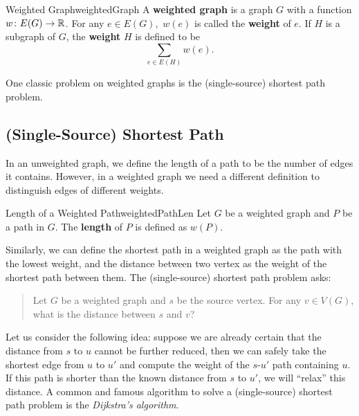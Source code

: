 \documentclass[math]{amznotes}
\theoremstyle{remark}
\begin{document}
\begin{dfnbox}{Weighted Graph}{weightedGraph}
    A {\color{red} \textbf{weighted graph}} is a graph $G$ with a function $w \colon E(G) \to \mathbb{R}$. For any $e \in E(G)$,~$w(e)$ is called the {\color{red} \textbf{weight}} of $e$. If $H$ is a subgraph of $G$, the {\color{red} \textbf{weight}} $H$ is defined to be
    \begin{equation*}
        \sum_{e \in E(H)}w(e).
    \end{equation*}
\end{dfnbox} 
One classic problem on weighted graphs is the (single-source) shortest path problem.
\subsection{(Single-Source) Shortest Path}
In an unweighted graph, we define the length of a path to be the number of edges it contains. However, in a weighted graph we need a different definition to distinguish edges of different weights.
\begin{dfnbox}{Length of a Weighted Path}{weightedPathLen}
    Let $G$ be a weighted graph and $P$ be a path in $G$. The {\color{red} \textbf{length}} of $P$ is defined as $w(P)$.
\end{dfnbox}
Similarly, we can define the shortest path in a weighted graph as the path with the lowest weight, and the distance between two vertex as the weight of the shortest path between them. The (single-source) shortest path problem asks:
\begin{quote}
    Let $G$ be a weighted graph and $s$ be the source vertex. For any $v \in V(G)$, what is the distance between $s$ and $v$?
\end{quote}
Let us consider the following idea: suppose we are already certain that the distance from $s$ to $u$ cannot be further reduced, then we can safely take the shortest edge from $u$ to $u'$ and compute the weight of the $s$-$u'$ path containing $u$. If this path is shorter than the known distance from $s$ to $u'$, we will ``relax'' this distance. A common and famous algorithm to solve a (single-source) shortest path problem is the \textit{Dijkstra's algorithm}.
\end{document}
